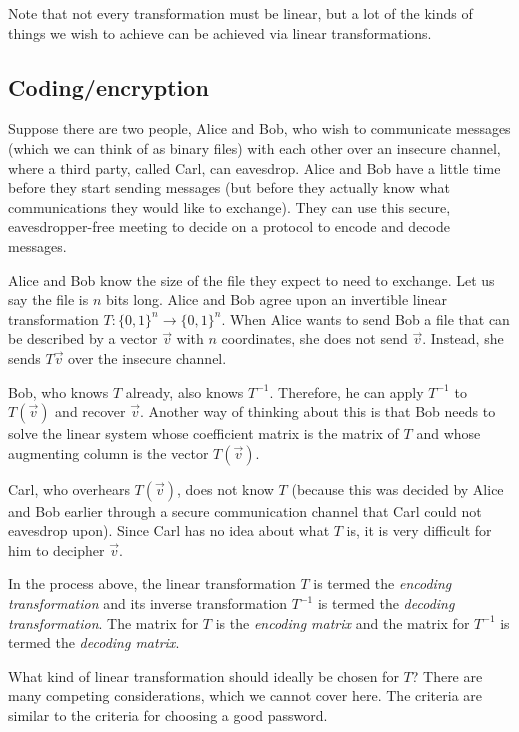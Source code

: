 \documentclass[10pt]{amsart}
\begin{document}
Note that not every transformation must be linear, but a lot of the
kinds of things we wish to achieve can be achieved via linear
transformations.

\subsection{Coding/encryption}

Suppose there are two people, Alice and Bob, who wish to communicate
messages (which we can think of as binary files) with each other over
an insecure channel, where a third party, called Carl, can
eavesdrop. Alice and Bob have a little time before they start sending
messages (but before they actually know what communications they would
like to exchange). They can use this secure, eavesdropper-free meeting
to decide on a protocol to encode and decode messages.

Alice and Bob know the size of the file they expect to need to
exchange. Let us say the file is $n$ bits long. Alice and Bob agree
upon an invertible linear transformation $T:\{ 0,1 \}^n \to \{ 0,1
\}^n$. When Alice wants to send Bob a file that can be described by a
vector $\vec{v}$ with $n$ coordinates, she does not send
$\vec{v}$. Instead, she sends $T\vec{v}$ over the insecure channel.

Bob, who knows $T$ already, also knows $T^{-1}$. Therefore, he can
apply $T^{-1}$ to $T(\vec{v})$ and recover $\vec{v}$. Another way of
thinking about this is that Bob needs to solve the linear system whose
coefficient matrix is the matrix of $T$ and whose augmenting column is
the vector $T(\vec{v})$.

Carl, who overhears $T(\vec{v})$, does not know $T$ (because this was
decided by Alice and Bob earlier through a secure communication
channel that Carl could not eavesdrop upon). Since Carl has no idea
about what $T$ is, it is very difficult for him to decipher $\vec{v}$.

In the process above, the linear transformation $T$ is termed the {\em
  encoding transformation} and its inverse transformation $T^{-1}$ is
termed the {\em decoding transformation}. The matrix for $T$ is the
{\em encoding matrix} and the matrix for $T^{-1}$ is termed the {\em
  decoding matrix}.

What kind of linear transformation should ideally be chosen for $T$?
There are many competing considerations, which we cannot cover
here. The criteria are similar to the criteria for choosing a good
password.
\end{document}
